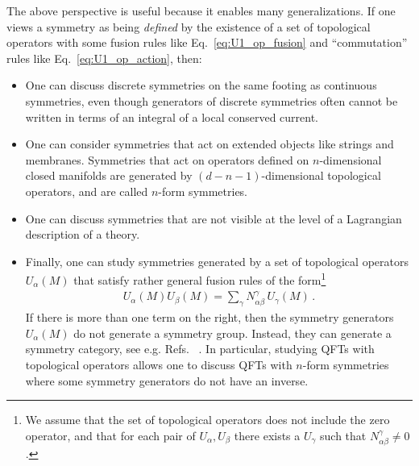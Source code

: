 \documentclass[11pt]{article}
\def\a{{\alpha}}
\def\b{{\beta}}
\def\g{{\gamma}}
\begin{document}
The above perspective is useful because it enables many generalizations.  If one
views a symmetry as being \emph{defined} by the existence of a set of topological
operators with some fusion rules like Eq.~\eqref{eq:U1_op_fusion} and
``commutation'' rules like Eq.~\eqref{eq:U1_op_action}, then:
\begin{itemize}
    \item  One can discuss discrete symmetries on
    the same footing as continuous symmetries, even though generators of discrete 
    symmetries often cannot be  written in terms of an integral of a local conserved current.
    \item One can consider symmetries that act on extended objects like strings
    and membranes.  Symmetries that act on operators defined on $n$-dimensional
    closed manifolds are generated by $(d-n -1)$-dimensional topological
    operators, and are called $n$-form symmetries.
    \item One can discuss symmetries that are not visible at the level of
    a Lagrangian description of a theory.
    \item Finally, one can study symmetries generated by a set of topological operators
    $U_{\a}(M)$ that satisfy rather general fusion rules of the form\footnote{We
    assume that the set of topological operators does not include the zero operator, and that for each pair of $U_\alpha,U_\beta$ there exists a $U_\gamma$ such that $N^\gamma_{\alpha\beta} \not=0$.}
    \begin{align} \label{eq:fusion}
        U_\a(M) U_\b(M) = \sum_{\g} N_{\a\b}^{\g}\, U_\g(M) \,.
    \end{align}
    If there is more than one term on the right, then the symmetry generators $U_{\a}(M)$ do not generate a symmetry group.  Instead, they can generate a symmetry category, see e.g. Refs.~
    \cite{Fuchs:2007tx,Bhardwaj:2017xup,Chang:2018iay,Ji:2019ugf,Lin:2019hks,Thorngren:2019iar,
    Ji:2019jhk,Komargodski:2020mxz,Rudelius:2020orz,Yu:2020twi,PhysRevResearch.2.043086,
    Aasen:2020jwb,Nguyen:2021yld,Heidenreich:2021tna,Huang:2021ytb,
    Inamura:2021wuo,Nguyen:2021naa,Sharpe:2021srf,Koide:2021zxj,
    Kaidi:2021gbs,Thorngren:2021yso,Delmastro:2021otj}.
    In particular, studying QFTs with topological operators allows one to discuss QFTs with $n$-form symmetries where some
    symmetry generators do not have an inverse.
\end{itemize}
\end{document}
